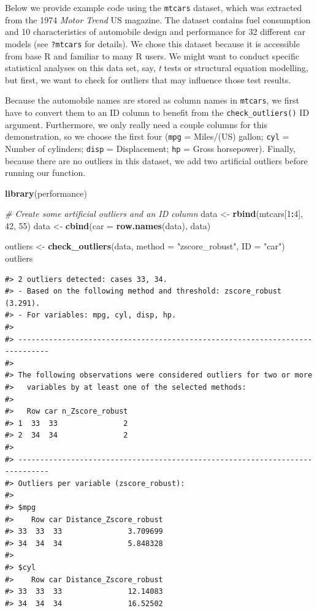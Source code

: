 \documentclass{article}
\newenvironment{Shaded}{\begin{snugshade}}{\end{snugshade}}
\newcommand{\AttributeTok}[1]{\textcolor[rgb]{0.13,0.29,0.53}{#1}}
\newcommand{\CommentTok}[1]{\textcolor[rgb]{0.56,0.35,0.01}{\textit{#1}}}
\newcommand{\DecValTok}[1]{\textcolor[rgb]{0.00,0.00,0.81}{#1}}
\newcommand{\FunctionTok}[1]{\textcolor[rgb]{0.13,0.29,0.53}{\textbf{#1}}}
\newcommand{\NormalTok}[1]{#1}
\newcommand{\OtherTok}[1]{\textcolor[rgb]{0.56,0.35,0.01}{#1}}
\newcommand{\SpecialCharTok}[1]{\textcolor[rgb]{0.81,0.36,0.00}{\textbf{#1}}}
\newcommand{\StringTok}[1]{\textcolor[rgb]{0.31,0.60,0.02}{#1}}
\begin{document}
Below we provide example code using the \texttt{mtcars} dataset, which
was extracted from the 1974 \emph{Motor Trend} US magazine. The dataset
contains fuel consumption and 10 characteristics of automobile design
and performance for 32 different car models (see \texttt{?mtcars} for
details). We chose this dataset because it is accessible from base R and
familiar to many R users. We might want to conduct specific statistical
analyses on this data set, say, \emph{t} tests or structural equation
modelling, but first, we want to check for outliers that may influence
those test results.

Because the automobile names are stored as column names in
\texttt{mtcars}, we first have to convert them to an ID column to
benefit from the \texttt{check\_outliers()} ID argument. Furthermore, we
only really need a couple columns for this demonstration, so we choose
the first four (\texttt{mpg} = Miles/(US) gallon; \texttt{cyl} = Number
of cylinders; \texttt{disp} = Displacement; \texttt{hp} = Gross
horsepower). Finally, because there are no outliers in this dataset, we
add two artificial outliers before running our function.

\begin{Shaded}
\begin{Highlighting}[]
\FunctionTok{library}\NormalTok{(performance)}

\CommentTok{\# Create some artificial outliers and an ID column}
\NormalTok{data }\OtherTok{\textless{}{-}} \FunctionTok{rbind}\NormalTok{(mtcars[}\DecValTok{1}\SpecialCharTok{:}\DecValTok{4}\NormalTok{], }\DecValTok{42}\NormalTok{, }\DecValTok{55}\NormalTok{)}
\NormalTok{data }\OtherTok{\textless{}{-}} \FunctionTok{cbind}\NormalTok{(}\AttributeTok{car =} \FunctionTok{row.names}\NormalTok{(data), data)}

\NormalTok{outliers }\OtherTok{\textless{}{-}} \FunctionTok{check\_outliers}\NormalTok{(data, }\AttributeTok{method =} \StringTok{"zscore\_robust"}\NormalTok{, }\AttributeTok{ID =} \StringTok{"car"}\NormalTok{)}
\NormalTok{outliers}
\end{Highlighting}
\end{Shaded}

\begin{verbatim}
#> 2 outliers detected: cases 33, 34.
#> - Based on the following method and threshold: zscore_robust (3.291).
#> - For variables: mpg, cyl, disp, hp.
#> 
#> -----------------------------------------------------------------------------
#>  
#> The following observations were considered outliers for two or more
#>   variables by at least one of the selected methods:
#> 
#>   Row car n_Zscore_robust
#> 1  33  33               2
#> 2  34  34               2
#> 
#> -----------------------------------------------------------------------------
#> Outliers per variable (zscore_robust): 
#> 
#> $mpg
#>    Row car Distance_Zscore_robust
#> 33  33  33               3.709699
#> 34  34  34               5.848328
#> 
#> $cyl
#>    Row car Distance_Zscore_robust
#> 33  33  33               12.14083
#> 34  34  34               16.52502
\end{verbatim}
\end{document}
